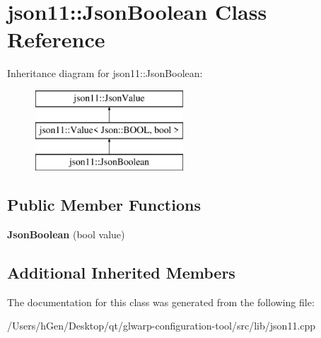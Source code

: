 \hypertarget{classjson11_1_1_json_boolean}{}\section{json11\+:\+:Json\+Boolean Class Reference}
\label{classjson11_1_1_json_boolean}
Inheritance diagram for json11\+:\+:Json\+Boolean\+:\begin{figure}[H]
\begin{center}
\leavevmode
\includegraphics[height=3.000000cm]{classjson11_1_1_json_boolean}
\end{center}
\end{figure}
\subsection*{Public Member Functions}
\begin{DoxyCompactItemize}
\item 
\mbox{\label{classjson11_1_1_json_boolean_a23d0577d5fd615eafad0d74f0b632ba4}} 
{\bfseries Json\+Boolean} (bool value)
\end{DoxyCompactItemize}
\subsection*{Additional Inherited Members}


The documentation for this class was generated from the following file\+:\begin{DoxyCompactItemize}
\item 
/\+Users/h\+Gen/\+Desktop/qt/glwarp-\/configuration-\/tool/src/lib/json11.\+cpp\end{DoxyCompactItemize}
